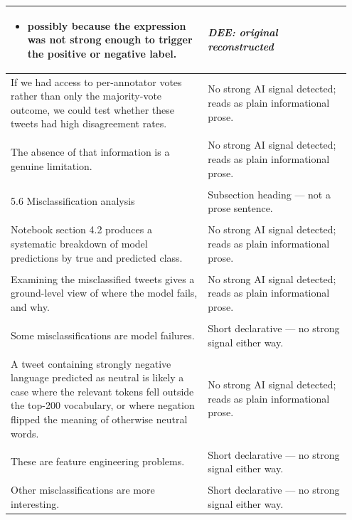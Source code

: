\documentclass[11pt]{article}
\begin{document}
\begin{longtable}{|p{0.55\linewidth}|p{0.40\linewidth}|}
{\begin{itemize}[leftmargin=*,topsep=2pt,itemsep=1pt,parsep=0pt]
  \item possibly because the expression was not strong enough to trigger the positive or negative label.\vspace{2em}
\end{itemize}} & \textbf{\textit{DEE: original reconstructed}} \\[2em]
\hline
If we had access to per-annotator votes rather than only the majority-vote outcome, we could test whether these tweets had high disagreement rates. & No strong AI signal detected; reads as plain informational prose. \\[2pt]
\hline
\rule{0pt}{3.5cm} & \\
\hline
The absence of that information is a genuine limitation. & No strong AI signal detected; reads as plain informational prose. \\[2pt]
\hline
\rule{0pt}{3.5cm} & \\
\hline
5.6 Misclassification analysis & Subsection heading --- not a prose sentence. \\[2pt]
\hline
\rule{0pt}{3.5cm} & \\
\hline
Notebook section 4.2 produces a systematic breakdown of model predictions by true and predicted class. & No strong AI signal detected; reads as plain informational prose. \\[2pt]
\hline
\rule{0pt}{3.5cm} & \\
\hline
Examining the misclassified tweets gives a ground-level view of where the model fails, and why. & No strong AI signal detected; reads as plain informational prose. \\[2pt]
\hline
\rule{0pt}{3.5cm} & \\
\hline
Some misclassifications are model failures. & Short declarative --- no strong signal either way. \\[2pt]
\hline
\rule{0pt}{3.5cm} & \\
\hline
A tweet containing strongly negative language predicted as neutral is likely a case where the relevant tokens fell outside the top-200 vocabulary, or where negation flipped the meaning of otherwise neutral words. & No strong AI signal detected; reads as plain informational prose. \\[2pt]
\hline
\rule{0pt}{3.5cm} & \\
\hline
These are feature engineering problems. & Short declarative --- no strong signal either way. \\[2pt]
\hline
\rule{0pt}{3.5cm} & \\
\hline
Other misclassifications are more interesting. & Short declarative --- no strong signal either way. \\[2pt]

\end{longtable}
\end{document}
